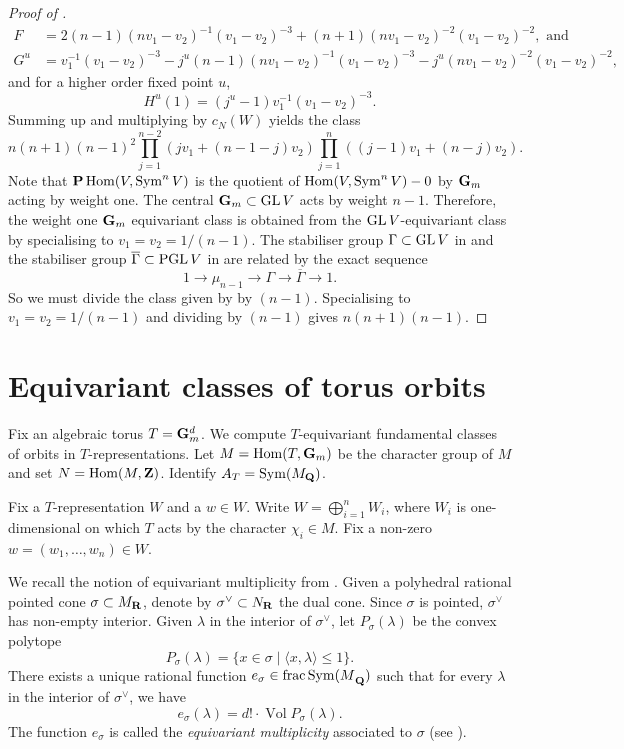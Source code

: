 \documentclass{amsart}
\begin{document}
\begin{proof}[Proof of ]
  \begin{align*}
    F &= 2(n-1)(n v_1 - v_2)^{-1}(v_1-v_2)^{-3} + (n+1)(n v_1 - v_2)^{-2}(v_1-v_2)^{-2}, \text{ and } \\
    G^u &= v_1^{-1}(v_1-v_2)^{-3}-j^{u}(n-1)(n v_1 - v_2)^{-1}(v_1-v_2)^{-3}- j^{u}(n v_1 - v_2)^{-2}(v_1-v_2)^{-2},
  \end{align*}
  and for a higher order fixed point \(u\),
  \[
   H^u(1) = (j^u-1) v_1^{-1}(v_1-v_2)^{-3}.
 \]
 Summing up and multiplying by \(c_N(W)\) yields the class
 \[ n(n+1)(n-1)^2\prod_{j = 1}^{n-2}(jv_1+(n-1-j)v_2) \prod_{j = 1}^n((j-1) v_1 + (n-j)v_2). \]
 Note that \({\bf P} \operatorname{Hom}(V, \operatorname{Sym}^nV)\) is the quotient of \(\operatorname{Hom}(V, \operatorname{Sym}^nV) - 0\) by \({\bf G}_m\) acting by weight one.
 The central \({\bf G}_m \subset \operatorname{GL} V\) acts by weight \(n-1\).
 Therefore, the weight one \({\bf G}_m\) equivariant class is obtained from the \(\operatorname{GL} V\)-equivariant class by specialising to \(v_1 = v_2 = 1/(n-1)\).
 The stabiliser group \(\Gamma \subset \operatorname{GL} V\) in  and the stabiliser group \(\overline \Gamma \subset \operatorname{PGL} V\) in  are related by the exact sequence
 \[ 1 \to \mu_{n-1} \to \Gamma \to \overline \Gamma \to 1.\]
 So we must divide the class given by  by \((n-1)\).
 Specialising to \(v_1 = v_2 = 1/(n-1)\) and dividing by \((n-1)\) gives \(n(n+1)(n-1)\).
 \end{proof}

 \appendix
 \section{Equivariant classes of torus orbits}\label{sec:torus}
 Fix an algebraic torus \(T = {\bf G}_m^d\).
 We compute \(T\)-equivariant fundamental classes of orbits in \(T\)-representations.
 Let \(M = \operatorname{Hom}(T, {\bf G}_m)\) be the character group of \(M\) and set \(N = \operatorname{Hom}(M, {\bf Z})\).
 Identify \(A_T = \operatorname{Sym}(M_{{\bf Q}})\).
 
 Fix a \(T\)-representation \(W\) and a \(w \in W\).
 Write \(W = \bigoplus_{i = 1}^n W_i\), where \(W_i\) is one-dimensional on which \(T\) acts by the character \(\chi_i \in M\).
Fix a non-zero \(w = (w_1, \dots, w_n) \in W\).

 We recall the notion of equivariant multiplicity from \cite{bri:97}.
 Given a polyhedral rational pointed cone \(\sigma \subset M_{{\bf R}}\), denote by \(\sigma^\vee \subset N_{{\bf R}}\) the dual cone.
 Since \(\sigma\) is pointed, \(\sigma^{\vee}\) has non-empty interior.
 Given \(\lambda\) in the interior of \(\sigma^{\vee}\), let \(P_{\sigma}(\lambda)\) be the convex polytope
 \[ P_{\sigma}(\lambda) = \{x \in \sigma \mid \langle  x, \lambda \rangle \leq 1\}.\]
 There exists a unique rational function \(e_{\sigma} \in \operatorname{frac}{\operatorname{Sym}(M}_{{\bf Q}})\) such that for every \(\lambda\) in the interior of \(\sigma^{\vee}\), we have
 \[ e_{\sigma}(\lambda) = d! \cdot \operatorname{Vol} P_{\sigma}(\lambda).\]
The function \(e_{\sigma}\) is called the \emph{equivariant multiplicity} associated to \(\sigma\) (see \cite[\S~5.2]{bri:97}).
\end{document}
